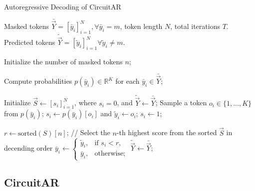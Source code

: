 \begin{algorithm}[tb]
\renewcommand{\algorithmicrequire}{\textbf{Input:}}
\renewcommand{\algorithmicensure}{\textbf{Output:}}
\caption{Autoregressive Decoding of CircuitAR}
\label{algo:decode}
\begin{algorithmic}[1] %
\REQUIRE Masked tokens $\bar{\vec{Y}} = [\bar{y}_i]_{i=1}^N, \forall \bar{y}_i = \mathit{m}$, token length $N$, total iterations $T$.
\ENSURE Predicted tokens $\tilde{\vec{Y}} = [\tilde{y}_i]_{i=1}^N \forall \tilde{y}_i \neq \mathit{m}$.

    \STATE Initialize the number of masked tokens $n$;

    \STATE Compute probabilities $p(\bar{y}_i) \in \mathbb{R}^{K}$ for each $\bar{y}_i \in \bar{\vec{Y}}$;

    \STATE Initialize $\vec{S} \gets [s_i]_{i=1}^N$, where $s_i = 0$, and $\tilde{\vec{Y}} \gets \bar{\vec{Y}}$;
            \STATE Sample a token $o_i \in \{1, \dots, K\}$ from $p(\bar{y}_i)$;
            \STATE $s_i \gets p(\bar{y}_i)[o_i]$ and $\tilde{y}_i \gets o_i$;
        \ELSE
            \STATE $s_i \gets 1$;
        \ENDIF
    \ENDFOR

    	\STATE $r \gets \text{sorted}(S)[n]$; // Select the $n$-th highest score from the sorted $\vec{S}$ in decending order
        \STATE $\bar{y}_i \gets 
        \begin{cases}
            \tilde{y}_i, & \text{if } s_i < r, \\
            \bar{y}_i,    & \text{otherwise;}
        \end{cases}$ 
    \ENDFOR
    \STATE $\tilde{\vec{Y}} \gets \bar{\vec{Y}}$;
\ENDFOR
\end{algorithmic}
\end{algorithm}

\subsection{CircuitAR}
\label{sec:circuitar}

